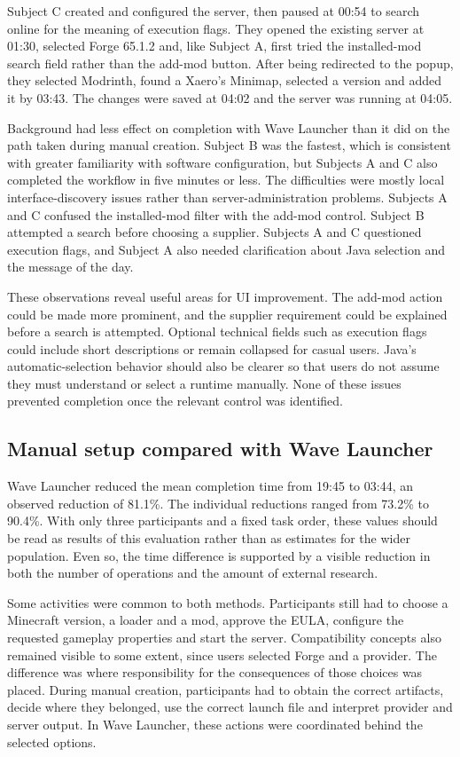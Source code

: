 Subject C created and configured the server, then paused at 00:54 to search online for the meaning of execution flags. They opened the existing server at 01:30, selected Forge 65.1.2 and, like Subject A, first tried the installed-mod search field rather than the add-mod button. After being redirected to the popup, they selected Modrinth, found a Xaero's Minimap, selected a version and added it by 03:43. The changes were saved at 04:02 and the server was running at 04:05.

Background had less effect on completion with Wave Launcher than it did on the path taken during manual creation. Subject B was the fastest, which is consistent with greater familiarity with software configuration, but Subjects A and C also completed the workflow in five minutes or less. The difficulties were mostly local interface-discovery issues rather than server-administration problems. Subjects A and C confused the installed-mod filter with the add-mod control. Subject B attempted a search before choosing a supplier. Subjects A and C questioned execution flags, and Subject A also needed clarification about Java selection and the message of the day.

These observations reveal useful areas for UI improvement. The add-mod action could be made more prominent, and the supplier requirement could be explained before a search is attempted. Optional technical fields such as execution flags could include short descriptions or remain collapsed for casual users. Java's automatic-selection behavior should also be clearer so that users do not assume they must understand or select a runtime manually. None of these issues prevented completion once the relevant control was identified.

\subsection{Manual setup compared with Wave Launcher}

Wave Launcher reduced the mean completion time from 19:45 to 03:44, an observed reduction of 81.1\%. The individual reductions ranged from 73.2\% to 90.4\%. With only three participants and a fixed task order, these values should be read as results of this evaluation rather than as estimates for the wider population. Even so, the time difference is supported by a visible reduction in both the number of operations and the amount of external research.

Some activities were common to both methods. Participants still had to choose a Minecraft version, a loader and a mod, approve the EULA, configure the requested gameplay properties and start the server. Compatibility concepts also remained visible to some extent, since users selected Forge and a provider. The difference was where responsibility for the consequences of those choices was placed. During manual creation, participants had to obtain the correct artifacts, decide where they belonged, use the correct launch file and interpret provider and server output. In Wave Launcher, these actions were coordinated behind the selected options.


